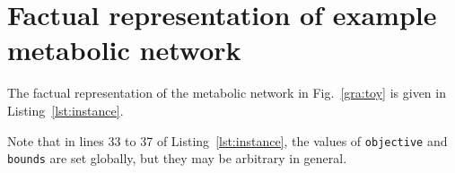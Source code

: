 
\section{Factual representation of example metabolic network}
\label{sec:appendix}

The factual representation of the metabolic network in Fig.~\ref{gra:toy} is given in Listing~\ref{lst:instance}.



Note that in lines 33 to 37 of Listing~\ref{lst:instance}, 
the values of \texttt{objective} and \texttt{bounds} are set globally,
but they may be arbitrary in general.


